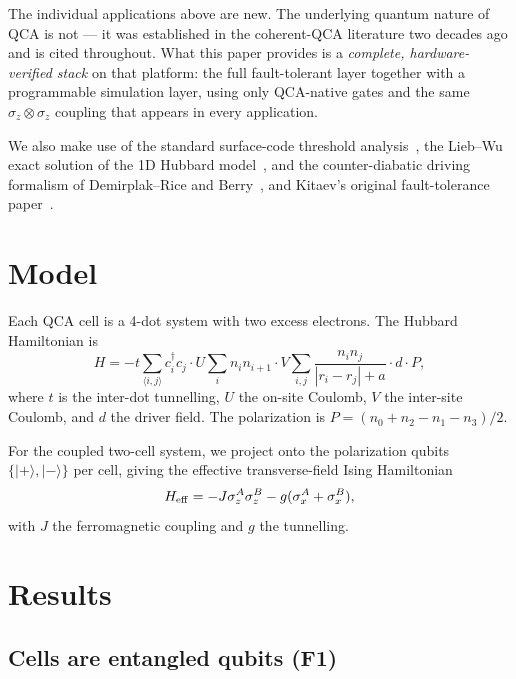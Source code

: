 \documentclass[11pt,aps,prl,twocolumn]{revtex4-2}
\begin{document}
The individual applications above are new.  The underlying
quantum nature of QCA is not --- it was established in the
coherent-QCA literature two decades ago and is cited throughout.
What this paper provides is a \emph{complete, hardware-verified
stack} on that platform: the full fault-tolerant layer together
with a programmable simulation layer, using only QCA-native gates
and the same $\sigma_z \otimes \sigma_z$ coupling that appears in
every application.


We also make use of the standard surface-code
threshold analysis~\cite{fowler2012surface}, the Lieb--Wu exact
solution of the 1D Hubbard model~\cite{lieb1968absence}, and
the counter-diabatic driving formalism of Demirplak--Rice and
Berry~\cite{demirplak2003adiabatic,berry2009transitionless}, and
Kitaev's original fault-tolerance paper~\cite{kitaev2003fault}.

\section{Model}

Each QCA cell is a 4-dot system with two excess electrons.  The
Hubbard Hamiltonian is
\begin{equation}
H = -t \sum_{\langle i,j\rangle} c_i^\dagger c_j

· U \sum_i n_i n_{i+1}
· V \sum_{i,j} \frac{n_i n_j}{|r_i - r_j| + a}

· d \cdot P,
  \end{equation}
  where $t$ is the inter-dot tunnelling, $U$ the on-site Coulomb,
  $V$ the inter-site Coulomb, and $d$ the driver field.  The
  polarization is $P = (n_0 + n_2 - n_1 - n_3)/2$.

For the coupled two-cell system, we project onto the
polarization qubits $\{|+\rangle, |-\rangle\}$ per cell, giving the
effective transverse-field Ising Hamiltonian
\begin{equation}
H_{\rm eff} = -J \sigma_z^A \sigma_z^B
- g (\sigma_x^A + \sigma_x^B),
\end{equation}
with $J$ the ferromagnetic coupling and $g$ the tunnelling.

\section{Results}

\subsection{Cells are entangled qubits (F1)}
\end{document}
